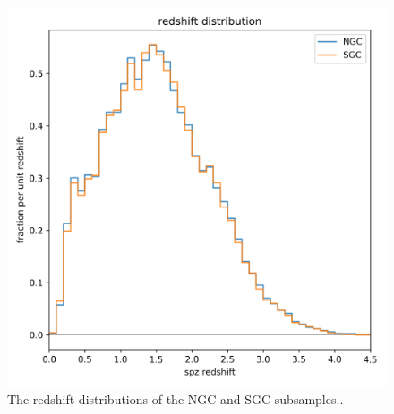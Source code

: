 \documentclass[modern]{aastex631}
\newlength{\figurewidth}
\begin{document}
\begin{figure}[t!]
  \begin{mdframed}
  \color{captiongray}
  \begin{center}
    \includegraphics[width=\figurewidth]{notebooks/zhist.png}
  \end{center}
    \caption{The redshift distributions of the NGC and SGC subsamples.\label{fig:zhist}.}
  \end{mdframed}
\end{figure}
\end{document}
